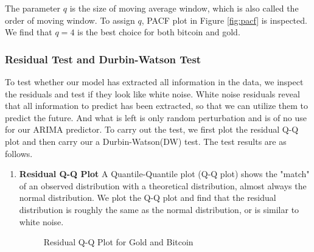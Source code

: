 \documentclass[12pt,a4paper]{article}
\newcommand{\Predictor}{ARIMA }
\begin{document}
\begin{spacing}{1.2}
The parameter $q$ is the size of moving average window, which is also called the order of moving window. To assign $q$, PACF plot in Figure \ref{fig:pacf} is inspected. We find that $q=4$ is the best choice for both bitcoin and gold.


\subsubsection{Residual Test and Durbin-Watson Test}
To test whether our model has extracted all information in the data, we inspect the residuals and test if they look like white noise. White noise residuals reveal that all information to predict has been extracted, so that we can utilize them to predict the future. And what is left is only random perturbation and is of no use for our \Predictor predictor. To carry out the test, we first plot the residual Q-Q plot and then carry our a Durbin-Watson(DW) test. The test results are as follows.

\begin{enumerate}
	\item \textbf{Residual Q-Q Plot}
	A Quantile-Quantile plot (Q-Q plot) shows the "match" of an observed distribution with a theoretical distribution, almost always the normal distribution. We plot the Q-Q plot and find that the residual distribution is roughly the same as the normal distribution, or is similar to white noise.
	
	\begin{figure}
		\begin{center}
		\end{center}
			\caption{Residual Q-Q Plot for Gold and Bitcoin}
		\label{fig:qq_plot}
	\end{figure}


\end{enumerate}
\end{spacing}
\end{document}
